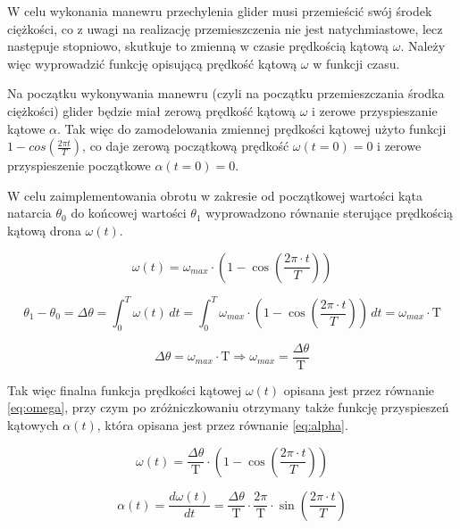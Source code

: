 W celu wykonania manewru przechylenia glider musi przemieścić swój środek ciężkości, co z uwagi na realizację przemieszczenia nie jest natychmiastowe, lecz następuje stopniowo, skutkuje to zmienną w czasie prędkością kątową $\omega$. Należy więc wyprowadzić funkcję opisującą prędkość kątową $\omega$ w funkcji czasu.

Na początku wykonywania manewru (czyli na początku przemieszczania środka ciężkości) glider będzie miał zerową prędkość kątową $\omega$ i zerowe przyspieszanie kątowe $\alpha$. Tak więc do zamodelowania zmiennej prędkości kątowej użyto funkcji $1-cos\left(\frac{2\pi t}{T}\right)$, co daje zerową początkową prędkość $\omega(t=0) = 0$ i zerowe przyspieszenie początkowe $\alpha(t=0) = 0$.

W celu zaimplementowania obrotu w zakresie od początkowej wartości kąta natarcia $\theta_0$ do końcowej wartości $\theta_1$ wyprowadzono równanie sterujące prędkością kątową drona $\omega(t)$.
 
\begin{equation}
	\nonumber
	\omega(t) = \omega_{max}\cdot\left(1-\cos\left(\frac{2\pi\cdot t}{T}\right)\right)
\end{equation}

\begin{equation}
	\nonumber
	\theta_1-\theta_0 = \Delta\theta = \int_{0}^{T}\omega(t)\,dt = \int_{0}^{T}\omega_{max}\cdot\left(1-\cos\left(\frac{2\pi\cdot t}{T}\right)\right)\,dt = \omega_{max}\cdot\text{T}
\end{equation}

\begin{equation}
	\nonumber
	\Delta\theta = \omega_{max}\cdot\text{T} \Longrightarrow \omega_{max}=\frac{\Delta\theta}{\text{T}}
\end{equation}

Tak więc finalna funkcja prędkości kątowej $\omega(t)$ opisana jest przez równanie \ref{eq:omega}, przy czym po zróżniczkowaniu otrzymany także funkcję przyspieszeń kątowych $\alpha(t)$, która opisana jest przez równanie \ref{eq:alpha}.

\begin{equation}
	\omega(t) = \frac{\Delta\theta}{\text{T}}\cdot\left(1-\cos\left(\frac{2\pi\cdot t}{T}\right)\right)
	\label{eq:omega}
\end{equation}

\begin{equation}
	\alpha(t) = \frac{d\omega(t)}{dt} = \frac{\Delta\theta}{\text{T}}\cdot\frac{2\pi}{\text{T}}\cdot\sin\left(\frac{2\pi\cdot t}{T}\right)
	\label{eq:alpha}
\end{equation}

